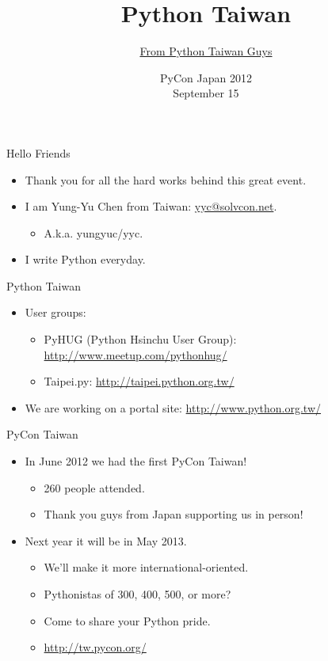 \documentclass[dvips,xcolor=pst,14pt]{beamer}
\title[Python Taiwan]{Python Taiwan}
\author[\href{http://www.python.org.tw/}{PyTWer}]%
{\href{http://www.python.org.tw/}{From Python Taiwan Guys}}
\institute[\href{http://www.python.org.tw/}{PyTW}]%
{\href{http://www.python.org.tw/}{Python Taiwan}}
\date[2012/9/15]{PyCon Japan 2012 \\ September 15}
\begin{document}
\begin{frame}
\titlepage
\end{frame}

\begin{frame}{
%
Hello Friends
%
}
\begin{itemize}
  \item Thank you for all the hard works behind this great event.
  \item I am Yung-Yu Chen from \alert{Taiwan}: \url{yyc@solvcon.net}.
  \begin{itemize}
    \item A.k.a. yungyuc/yyc.
  \end{itemize}
  \item I write Python everyday.
\end{itemize}
\end{frame}

\begin{frame}{
%
Python Taiwan
%
}
\begin{itemize}
  \item User groups:
  \begin{itemize}
    \item \alert{PyHUG} (Python Hsinchu User Group):
    \url{http://www.meetup.com/pythonhug/}
    \item \alert{Taipei.py}: \url{http://taipei.python.org.tw/}
  \end{itemize}
  \item We are working on a portal site: \url{http://www.python.org.tw/}
\end{itemize}
\end{frame}

\begin{frame}{
%
PyCon Taiwan
%
}
\begin{itemize}
  \item In June 2012 we had the first PyCon Taiwan!
  \begin{itemize}
    \item 260 people attended.
    \item Thank you guys from Japan supporting us in person!
  \end{itemize}
  \item Next year it will be in May 2013.
  \begin{itemize}
    \item We'll make it more international-oriented.
    \item Pythonistas of 300, 400, 500, or more?
    \item Come to share your Python pride.
    \item \url{http://tw.pycon.org/}
  \end{itemize}
\end{itemize}
\end{frame}
\end{document}

